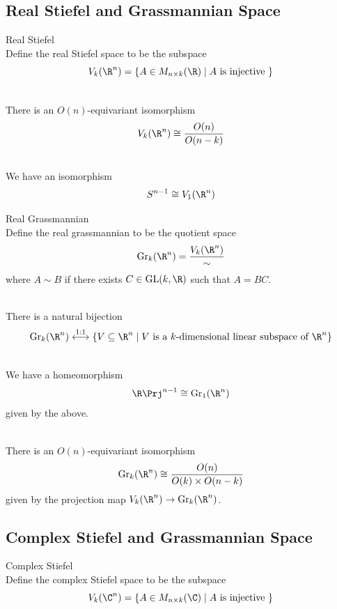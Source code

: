 \documentclass[a4paper]{article}
\begin{document}
\subsection{Real Stiefel and Grassmannian Space}
\begin{defn}{Real Stiefel}{}\\
Define the real Stiefel space to be the subspace $$V_k(\R^n)=\{A\in M_{n\times k}(\R)\;|\;A\text{ is injective }\}$$
\end{defn}

\begin{prp}{}{}\\
There is an $O(n)$-equivariant isomorphism $$V_k(\R^n)\cong\frac{O(n)}{O(n-k)}$$
\end{prp}

\begin{eg}{}{}\\
We have an isomorphism $$S^{n-1}\cong V_1(\R^n)$$
\end{eg}

\begin{defn}{Real Grassmannian}{}\\
Define the real grassmannian to be the quotient space $$\text{Gr}_k(\R^n)=\frac{V_k(\R^n)}{\sim}$$ where $A\sim B$ if there exists $C\in\text{GL}(k,\R)$ such that $A=BC$. 
\end{defn}

\begin{prp}{}{}\\
There is a natural bijection $$\text{Gr}_k(\R^n)\overset{1:1}{\longleftrightarrow}\{V\subseteq\R^n\;|\;V\text{ is a }k\text{-dimensional linear subspace of }\R^n\}$$
\end{prp}

\begin{eg}{}{}\\
We have a homeomorphism $$\R\Prj^{n-1}\cong\text{Gr}_1(\R^n)$$ given by the above. 
\end{eg}

\begin{prp}{}{}\\
There is an $O(n)$-equivariant isomorphism $$\text{Gr}_k(\R^n)\cong\frac{O(n)}{O(k)\times O(n-k)}$$ given by the projection map $V_k(\R^n)\to\text{Gr}_k(\R^n)$. 
\end{prp}

\subsection{Complex Stiefel and Grassmannian Space}
\begin{defn}{Complex Stiefel}{}\\
Define the complex Stiefel space to be the subspace $$V_k(\C^n)=\{A\in M_{n\times k}(\C)\;|\;A\text{ is injective }\}$$
\end{defn}
\end{document}
